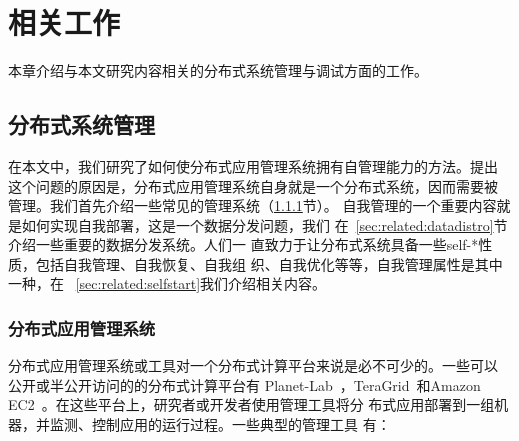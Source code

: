 \chapter{相关工作}
\label{chap:related}

本章介绍与本文研究内容相关的分布式系统管理与调试方面的工作。





\section{分布式系统管理}


% 
% 
% 
% 
% 
% 

在本文中，我们研究了如何使分布式应用管理系统拥有自管理能力的方法。提出
这个问题的原因是，分布式应用管理系统自身就是一个分布式系统，因而需要被
管理。我们首先介绍一些常见的管理系统（\ref{sec:related:mgmtsys}节）。
自我管理的一个重要内容就是如何实现自我部署，这是一个数据分发问题，我们
在~\ref{sec:related:datadistro}节介绍一些重要的数据分发系统。人们一
直致力于让分布式系统具备一些self-*性质，包括自我管理、自我恢复、自我组
织、自我优化等等，自我管理属性是其中一种，在
~\ref{sec:related:selfstart}我们介绍相关内容。

\subsection{分布式应用管理系统}
\label{sec:related:mgmtsys}

分布式应用管理系统或工具对一个分布式计算平台来说是必不可少的。一些可以
公开或半公开访问的的分布式计算平台有
Planet-Lab~\cite{Bavier2004}，TeraGrid~\cite{Catlett2002}和Amazon
EC2~\cite{Garfinkel2007}。在这些平台上，研究者或开发者使用管理工具将分
布式应用部署到一组机器，并监测、控制应用的运行过程。一些典型的管理工具
有：

